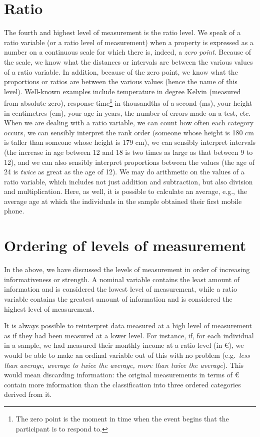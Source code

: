 \documentclass[
]{book}
\begin{document}
\section{Ratio}\label{sec:ratio}

The fourth and highest level of measurement is the ratio level. We speak of a ratio variable (or a ratio level of measurement) when a property is expressed as a number on a continuous scale for which there is, indeed, a \emph{zero point}. Because of the scale, we know what the distances or intervals are between the various values of a ratio variable. In addition, because of the zero point, we know what the proportions or ratios are between the various values (hence the name of this level). Well-known examples include temperature in degree Kelvin (measured from absolute zero), response time\footnote{The zero point is the moment in time when the event begins that the participant is to respond to.} in thousandths of a second (ms), your height in centimetres (cm), your age in years, the number of errors made on a test, etc. When we are dealing with a ratio variable, we can count how often each category occurs, we can sensibly interpret the rank order (someone whose height is 180 cm is taller than someone whose height is 179 cm), we can sensibly interpret intervals (the increase in age between 12 and 18 is two times as large as that between 9 to 12), and we can also sensibly interpret proportions between the values (the age of 24 is \emph{twice} as great as the age of 12). We may do arithmetic on the values of a ratio variable, which includes not just addition and subtraction, but also division and multiplication. Here, as well, it is possible to calculate an average, e.g., the average age at which the individuals in the sample obtained their first mobile phone.

\section{Ordering of levels of measurement}\label{sec:orderinglevelsofmeasurement}

In the above, we have discussed the levels of measurement in order of increasing informativeness or strength. A nominal variable contains the least amount of information and is considered the lowest level of measurement, while a ratio variable contains the greatest amount of information and is considered the highest level of measurement.

It is always possible to reinterpret data measured at a high level of measurement as if they had been measured at a lower level. For instance, if, for each individual in a sample, we had measured their monthly income at a ratio level (in €), we would be able to make an ordinal variable out of this with no problem (e.g.~\emph{less than average, average to twice the average, more than twice the average}). This would mean discarding information: the original measurements in terms of € contain more information than the classification into three ordered categories derived from it.
\end{document}

